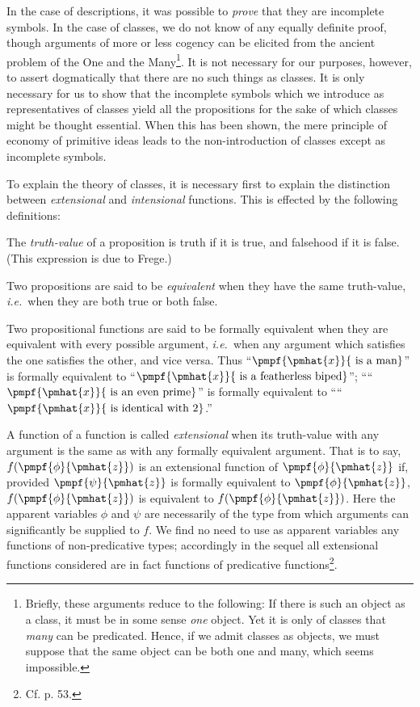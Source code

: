 \documentclass[letterpaper,12pt,openany,leqno]{book}
\newcommand{\pagefirst}[1]{\marginnote[\boxed{\text{#1}}]{\boxed{\text{#1}}}}
\begin{document}
In the case of descriptions, it was possible to \textit{prove} that they are incomplete symbols. In the case of classes, we do not know of any equally definite proof, though arguments of more or less cogency can be elicited from the ancient problem of the One and the Many\footnote{Briefly, these arguments reduce to the following: If there is such an object as a class, it must be in some sense \textit{one} object. Yet it is only of classes that \textit{many} can be predicated. Hence, if we admit classes as objects, we must suppose that the same object can be both one and many, which seems impossible.}. It is not necessary for our purposes, however, to assert dogmatically that there are no such things as classes. It is only necessary for us to show that the incomplete symbols which we introduce as representatives of classes yield all the propositions for the sake of which classes might be thought essential. When this has been shown, the mere principle of economy of primitive ideas leads to the non-introduction of classes except as incomplete symbols.

\pagefirst{76} To explain the theory of classes, it is necessary first to explain the distinction between \textit{extensional} and \textit{intensional} functions. This is effected by the following definitions:

The \textit{truth-value} of a proposition is truth if it is true, and falsehood if it is false. (This expression is due to Frege.)

Two propositions are said to be \textit{equivalent} when they have the same truth-value, \textit{i.e.}\ when they are both true or both false.

Two propositional functions are said to be formally equivalent when they are equivalent with every possible argument, \textit{i.e.}\ when any argument which satisfies the one satisfies the other, and vice versa. Thus ``$\pmpf{\pmhat{x}}{\text{ is a man}}$'' is formally equivalent to ``$\pmpf{\pmhat{x}}{\text{ is a featherless biped}}$''; ````$\pmpf{\pmhat{x}}{\text{ is an even prime}}$'' is formally equivalent to ````$\pmpf{\pmhat{x}}{\text{ is identical with 2}}$.''

A function of a function is called \textit{extensional} when its truth-value with any argument is the same as with any formally equivalent argument. That is to say, $f(\pmpf{\phi}{\pmhat{z}})$ is an extensional function of $\pmpf{\phi}{\pmhat{z}}$ if, provided $\pmpf{\psi}{\pmhat{z}}$ is formally equivalent to $\pmpf{\phi}{\pmhat{z}}$, $f(\pmpf{\phi}{\pmhat{z}})$ is equivalent to $f(\pmpf{\phi}{\pmhat{z}})$. Here the apparent variables $\phi$ and $\psi$ are necessarily of the type from which arguments can significantly be supplied to $f$. We find no need to use as apparent variables any functions of non-predicative types; accordingly in the sequel all extensional functions considered are in fact functions of predicative functions\footnote{Cf. p. 53.}.
\end{document}
